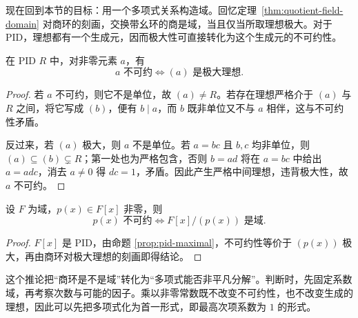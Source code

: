 \documentclass[lang=cn,a4paper,fontset=none,zihao=false,10pt,openany,twoside]{beautybook}
\numberwithin{algorithm}{chapter}
\begin{document}
现在回到本节的目标：用一个多项式关系构造域。回忆定理~\ref{thm:quotient-field-domain} 对商环的刻画，交换带幺环的商是域，当且仅当所取理想极大。对于 PID，理想都有一个生成元，因而极大性可直接转化为这个生成元的不可约性。
\begin{proposition}[不可约元与极大理想]\label{prop:pid-maximal}
在 PID $R$ 中，对非零元素 $a$，有
\[
 a\text{ 不可约}\Longleftrightarrow(a)\text{ 是极大理想}.
\]
\end{proposition}
\begin{proof}
若 $a$ 不可约，则它不是单位，故 $(a)\ne R$。若存在理想严格介于 $(a)$ 与 $R$ 之间，将它写成 $(b)$，便有 $b\mid a$，而 $b$ 既非单位又不与 $a$ 相伴，这与不可约性矛盾。

反过来，若 $(a)$ 极大，则 $a$ 不是单位。若 $a=bc$ 且 $b,c$ 均非单位，则 $(a)\subseteq(b)\subsetneq R$；第一处也为严格包含，否则 $b=ad$ 将在 $a=bc$ 中给出 $a=adc$，消去 $a\ne0$ 得 $dc=1$，矛盾。因此产生严格中间理想，违背极大性，故 $a$ 不可约。
\end{proof}

\begin{corollary}[由不可约多项式构造域]\label{cor:polynomial-field}
设 $F$ 为域，$p(x)\in F[x]$ 非零，则
\[
 p(x)\text{ 不可约}\Longleftrightarrow F[x]/(p(x))\text{ 是域}.
\]
\end{corollary}
\begin{proof}
$F[x]$ 是 PID，由命题 \ref{prop:pid-maximal}，不可约性等价于 $(p(x))$ 极大，再由商环对极大理想的刻画即得结论。
\end{proof}

这个推论把“商环是不是域”转化为“多项式能否非平凡分解”。判断时，先固定系数域，再考察次数与可能的因子。乘以非零常数既不改变不可约性，也不改变生成的理想，因此可以先把多项式化为首一形式，即最高次项系数为 $1$ 的形式。
\end{document}
